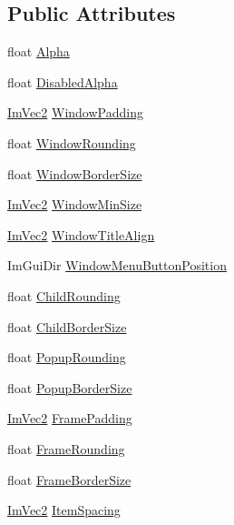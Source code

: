 \subsection*{Public Attributes}
\begin{DoxyCompactItemize}
\item 
float \hyperlink{structImGuiStyle_a993312606e9dcb7ca165245150a4da72}{Alpha}
\item 
float \hyperlink{structImGuiStyle_ac497d4a539ff1daf63a8e6a23bd23b0e}{Disabled\+Alpha}
\item 
\hyperlink{structImVec2}{Im\+Vec2} \hyperlink{structImGuiStyle_a37f156b53e6dcc99ff57366ceafe8b50}{Window\+Padding}
\item 
float \hyperlink{structImGuiStyle_acd902c2ab4b53d4bb0f64da608320894}{Window\+Rounding}
\item 
float \hyperlink{structImGuiStyle_a4e2af4dd711f57ee841f9c843a18bec2}{Window\+Border\+Size}
\item 
\hyperlink{structImVec2}{Im\+Vec2} \hyperlink{structImGuiStyle_a060b2f743a086d0f0fee4cd5b3f372d4}{Window\+Min\+Size}
\item 
\hyperlink{structImVec2}{Im\+Vec2} \hyperlink{structImGuiStyle_a3fc57a15ab8f206045f1e5dfccd8b2e7}{Window\+Title\+Align}
\item 
Im\+Gui\+Dir \hyperlink{structImGuiStyle_ab67a3fe38a4c109fe9de03228fb2c172}{Window\+Menu\+Button\+Position}
\item 
float \hyperlink{structImGuiStyle_aba2b4c6be52366ce2ac06b7849cd5cb2}{Child\+Rounding}
\item 
float \hyperlink{structImGuiStyle_a5dd4fc33733ac7171d88740eb777f2e3}{Child\+Border\+Size}
\item 
float \hyperlink{structImGuiStyle_a44b39e666946eea00001b6e38ab6bdc7}{Popup\+Rounding}
\item 
float \hyperlink{structImGuiStyle_ac3bc5e785e360f72b580d419953c9db4}{Popup\+Border\+Size}
\item 
\hyperlink{structImVec2}{Im\+Vec2} \hyperlink{structImGuiStyle_af58dc4e954ac95fdb3b0df8efb2fa564}{Frame\+Padding}
\item 
float \hyperlink{structImGuiStyle_a15402cededdef985487e986ccce73ad2}{Frame\+Rounding}
\item 
float \hyperlink{structImGuiStyle_a21d8f1680e9f897998d726fdf0123bf2}{Frame\+Border\+Size}
\item 
\hyperlink{structImVec2}{Im\+Vec2} \hyperlink{structImGuiStyle_a6bc07d81e049cd75e86e6b3753c0da4a}{Item\+Spacing}
\item 

\end{DoxyCompactItemize}
